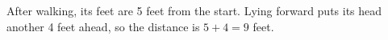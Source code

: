 After walking, its feet are 5 feet from the start. Lying forward puts its head another 4 feet ahead, so the distance is $ 5+4=\boxed9 $ feet.
